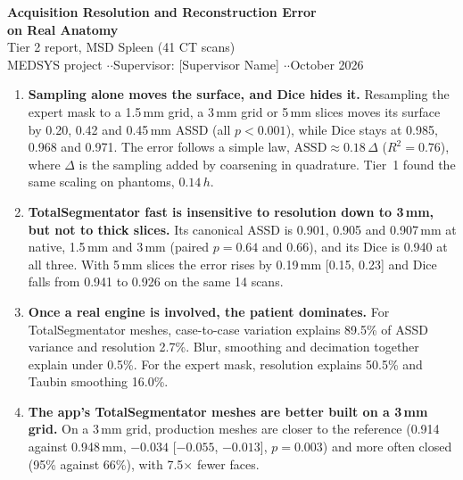 \documentclass[10pt,a4paper]{article}
\begin{document}
\color{brandtext}

\begin{center}
{\LARGE\bfseries Acquisition Resolution and Reconstruction Error\\[2pt] on Real Anatomy}\\[6pt]
{\large Tier 2 report, MSD Spleen (41 CT scans)}\\[6pt]
{\small\color{brandtext2} MEDSYS project \enspace$\cdot$ \enspace$\cdot$\enspace Supervisor: [Supervisor Name] \enspace$\cdot$ \enspace$\cdot$\enspace October 2026}
\end{center}
\vspace{-4pt}{\color{brandorange}\rule{\linewidth}{1.2pt}}

\begin{tcolorbox}[colback=brandpanel,colframe=brandorange,boxrule=0.6pt,arc=2pt,left=8pt,right=8pt,top=6pt,bottom=6pt,
  title={\bfseries Key findings},coltitle=brandtext,colbacktitle=brandpanel,toptitle=2pt,bottomtitle=0pt]
\begin{enumerate}[leftmargin=1.4em,itemsep=3pt]
\item \textbf{Sampling alone moves the surface, and Dice hides it.} Resampling the expert mask to a 1.5\,mm grid, a 3\,mm grid or 5\,mm slices moves its surface by 0.20, 0.42 and 0.45\,mm ASSD (all $p<0.001$), while Dice stays at 0.985, 0.968 and 0.971. The error follows a simple law, $\text{ASSD}\approx0.18\,\Delta$ ($R^2=0.76$), where $\Delta$ is the sampling added by coarsening in quadrature. Tier~1 found the same scaling on phantoms, $0.14\,h$.
\item \textbf{TotalSegmentator fast is insensitive to resolution down to 3\,mm, but not to thick slices.} Its canonical ASSD is 0.901, 0.905 and 0.907\,mm at native, 1.5\,mm and 3\,mm (paired $p=0.64$ and $0.66$), and its Dice is 0.940 at all three. With 5\,mm slices the error rises by 0.19\,mm [0.15, 0.23] and Dice falls from 0.941 to 0.926 on the same 14 scans.
\item \textbf{Once a real engine is involved, the patient dominates.} For TotalSegmentator meshes, case-to-case variation explains 89.5\% of ASSD variance and resolution 2.7\%. Blur, smoothing and decimation together explain under 0.5\%. For the expert mask, resolution explains 50.5\% and Taubin smoothing 16.0\%.
\item \textbf{The app's TotalSegmentator meshes are better built on a 3\,mm grid.} On a 3\,mm grid, production meshes are closer to the reference (0.914 against 0.948\,mm, $-0.034$ [$-0.055$, $-0.013$], $p=0.003$) and more often closed (95\% against 66\%), with 7.5$\times$ fewer faces.

\end{enumerate}
\end{tcolorbox}
\end{document}

